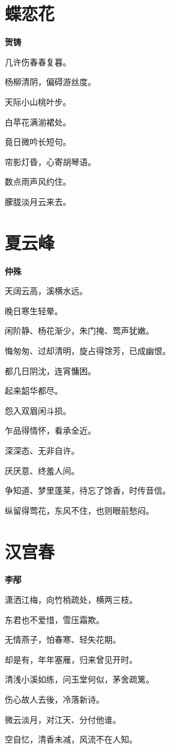 \documentclass[12pt,a4paper]{ctexbook}
\begin{document}
\section{蝶恋花}
\textbf{贺铸}\par\vspace{0.5em}
几许伤春春复暮。\par
杨柳清阴，偏碍游丝度。\par
天际小山桃叶步。\par
白苹花满湔裙处。\par
竟日微吟长短句。\par
帘影灯昏，心寄胡琴语。\par
数点雨声风约住。\par
朦胧淡月云来去。\par

\section{夏云峰}
\textbf{仲殊}\par\vspace{0.5em}
天阔云高，溪横水远。\par
晚日寒生轻晕。\par
闲阶静、杨花渐少，朱门掩、莺声犹嫩。\par
悔匆匆、过却清明，旋占得馀芳，已成幽恨。\par
都几日阴沈，连宵慵困。\par
起来韶华都尽。\par
怨入双眉闲斗损。\par
乍品得情怀，看承全近。\par
深深态、无非自许。\par
厌厌意、终羞人间。\par
争知道、梦里蓬莱，待忘了馀香，时传音信。\par
纵留得莺花，东风不住，也则眼前愁闷。\par

\section{汉宫春}
\textbf{李邴}\par\vspace{0.5em}
潇洒江梅，向竹梢疏处，横两三枝。\par
东君也不爱惜，雪压霜欺。\par
无情燕子，怕春寒、轻失花期。\par
却是有，年年塞雁，归来曾见开时。\par
清浅小溪如练，问玉堂何似，茅舍疏篱。\par
伤心故人去後，冷落新诗。\par
微云淡月，对江天、分付他谁。\par
空自忆，清香未减，风流不在人知。\par
\end{document}
